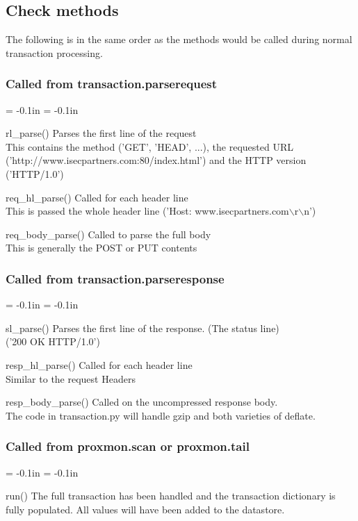 \documentclass{article}
\newenvironment{mindesc}{\begin{description}\parsep = -0.1in \itemsep = -0.1in}{\end{description}}
\begin{document}
\subsection{Check methods}
The following is in the same order as the methods would be called during
normal transaction processing.
\subsubsection{Called from transaction.parserequest}
\begin{mindesc}
\item[rl\_parse()] Parses the first line of the request\\
This contains the method ('GET', 'HEAD', ...), the requested URL 
('http://www.isecpartners.com:80/index.html') and the HTTP version ('HTTP/1.0')
\item[req\_hl\_parse()] Called for each header line\\
This is passed the whole header line ('Host: www.isecpartners.com$\backslash$r$\backslash$n')
\item[req\_body\_parse()] Called to parse the full body\\
This is generally the POST or PUT contents
\end{mindesc}
\subsubsection{Called from transaction.parseresponse}
\begin{mindesc}
\item[sl\_parse()] Parses the first line of the response. (The status line)\\
('200 OK HTTP/1.0')
\item[resp\_hl\_parse()] Called for each header line\\
Similar to the request Headers
\item[resp\_body\_parse()] Called on the uncompressed response body.\\
The code in transaction.py will handle gzip and both varieties of deflate.
\end{mindesc}
\subsubsection{Called from proxmon.scan or proxmon.tail}
\begin{mindesc}
\item[run()] The full transaction has been handled and the transaction 
dictionary is fully populated.  All values will have been added to the datastore.
\end{mindesc}
\end{document}
